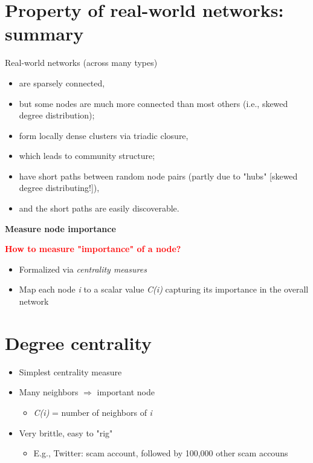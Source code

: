 \documentclass[11pt]{article}
\begin{document}
\section*{Property of real-world networks: summary}
Real-world networks (across many types)
\begin{itemize}
	\item are sparsely connected,
	\item but some nodes are much more connected than most others (i.e., skewed degree distribution);
	\item form locally dense clusters via triadic closure,
	\item which leads to community structure;
	\item have short paths between random node pairs (partly due to "hubs" [skewed degree distributing!]),
	\item and the short paths are easily discoverable.
\end{itemize}

\vspace{0.5cm}

\begin{center}
  {\LARGE \textbf{Measure node importance}}
\end{center}
\vspace{0.5cm}
\textbf{\textcolor{red}{How to measure "importance" of a node?}}
\begin{itemize}
	\item Formalized via \textit{centrality measures}
	\item Map each node \textit{i} to a scalar value \textit{C(i)} capturing its importance in the overall network
\end{itemize}

\section*{Degree centrality}
\begin{itemize}
	\item Simplest centrality measure
	\item Many neighbors $\Rightarrow$ important node
		\begin{itemize}
			\item \textit{C(i)} = number of neighbors of \textit{i}
		\end{itemize}
	\item Very brittle, easy to "rig"
		\begin{itemize}
			\item E.g., Twitter: scam account, followed by 100,000 other scam accouns
		\end{itemize}
\end{itemize}
\end{document}
